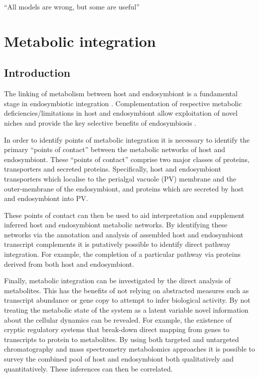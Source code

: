 \graphicspath{{chapters/5.Chapter_3/figures/}}

\begin{savequote}[75mm]
``All models are wrong, but some are useful''
\end{savequote}

\chapter{Metabolic integration}

\section{Introduction}

The linking of metabolism between host and endosymbiont is a fundamental 
stage in endosymbiotic integration \citep{Bhattacharya2007,Karkar2015a}.
Complementation of respective metabolic deficiencies/limitations in
host and endosymbiont allow exploitation of novel niches and provide
the key selective benefits of endosymbiosis \citep{Hoffmeister2003}.

In order to identify points of metabolic integration it is necessary to
identify the primary ``points of contact'' between the metabolic networks 
of host and endosymbiont. These ``points of contact'' comprise two
major classes of proteins, transporters and secreted proteins. 
Specifically, host and endosymbiont transporters which localise to the
perialgal vacuole (PV) membrane and the outer-membrane of the endosymbiont,
and proteins which are secreted by host and endosymbiont into 
PV.  

These points of contact can then be used to aid interpretation
and supplement inferred host and endosymbiont metabolic networks. 
By identifying these networks via the annotation and analysis of
assembled host and endosymbiont transcript complements it is putatively
possible to identify direct pathway integration.  For example,
the completion of a particular pathway via proteins derived from both
host and endosymbiont.

%

Finally, metabolic integration can be investigated by the 
direct analysis of metabolites.  This has the benefits of not
relying on abstracted measures such as transcript abundance or gene
copy to attempt to infer biological activity. By not treating the metabolic
state of the system as a latent variable novel information about the cellular
dynamics can be revealed.   For example, the existence of cryptic regulatory
systems that break-down direct mapping from genes to transcripts to protein to 
metabolites. By using both targeted and untargeted chromatography and mass
spectrometry metabolomics approaches it is possible to survey the combined
pool of host and endosymbiont both qualitatively and quantitatively. 
These inferences can then be correlated.

